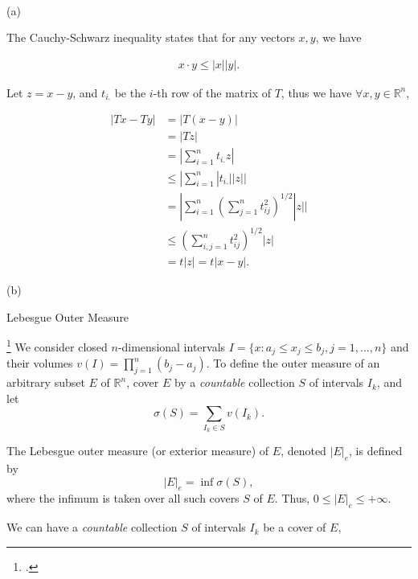 \documentclass[UTF8,a4paper,10pt]{article}
\begin{document}
  \begin{solution}\,

  (a)

    The Cauchy-Schwarz inequality states that for any vectors \(x,y\), we have

    \begin{equation*}
      \begin{aligned}
        x\cdot y\leq |x||y|.
      \end{aligned}
    \end{equation*}

Let \(z=x-y\), and \(t_{i.}\) be the \(i\)-th row of the matrix of \(T\), thus we have \(\forall x,y \in\mathbb{R}^n\),

    \begin{equation*}
      \begin{aligned}
        |Tx - Ty| 
        &= |T(x-y)|\\
        &= |Tz|\\ 
        &= |\sum_{i=1}^{n} t_{i.}z| \\
        &\leq |\sum_{i=1}^{n} |t_{i.}||z||\\     
        &= |\sum_{i=1}^{n} (\sum_{j=1}^{n}t_{ij}^2)^{1/2}|z||\\
        &\leq (\sum_{i,j=1}^{n}t_{ij}^2)^{1/2}|z|\\     
        &= t|z| = t|x - y|. 
      \end{aligned}
    \end{equation*}

    (b)

    \begin{mybox}{Lebesgue Outer Measure}

      \footcite[][41]{Wheeden_Zygmund_2015}  
    We consider closed \(n\)-dimensional intervals \(I = \{x: a_j \leq x_j \leq b_j, j = 1,\ldots, n\}\) and their volumes \(v(I) = \prod_{j=1}^n(b_j - a_j)\). To define the outer measure of an arbitrary subset \(E\) of \(\mathbb{R}^n\), cover \(E\) by a \textit{countable} collection \(S\) of intervals \(I_k\), and let 
    \[\sigma(S) = \sum_{I_k\in S} v(I_k).\]

The Lebesgue outer measure (or exterior measure) of \(E\), denoted \(|E|_e\), is defined by
\[|E|_e = \inf \sigma(S),\]
where the infimum is taken over all such covers \(S\) of \(E\). Thus, \(0 \leq |E|_e \leq +\infty\).
    \end{mybox}

We can have a \textit{countable} collection \(S\) of intervals \(I_k\) be a cover of \(E\),


\end{solution}
\end{document}
